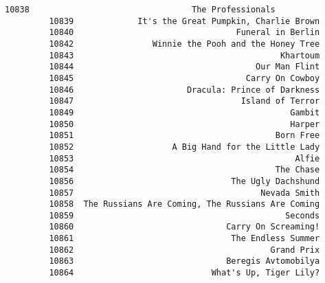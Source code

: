\documentclass[11pt]{article}
\begin{document}
\begin{Verbatim}[commandchars=\\\{\}]
         10838                                 The Professionals   
         10839             It's the Great Pumpkin, Charlie Brown   
         10840                                 Funeral in Berlin   
         10842                Winnie the Pooh and the Honey Tree   
         10843                                          Khartoum   
         10844                                     Our Man Flint   
         10845                                   Carry On Cowboy   
         10846                       Dracula: Prince of Darkness   
         10847                                  Island of Terror   
         10849                                            Gambit   
         10850                                            Harper   
         10851                                         Born Free   
         10852                    A Big Hand for the Little Lady   
         10853                                             Alfie   
         10854                                         The Chase   
         10856                                The Ugly Dachshund   
         10857                                      Nevada Smith   
         10858  The Russians Are Coming, The Russians Are Coming   
         10859                                           Seconds   
         10860                               Carry On Screaming!   
         10861                                The Endless Summer   
         10862                                        Grand Prix   
         10863                               Beregis Avtomobilya   
         10864                            What's Up, Tiger Lily?   
         

\end{Verbatim}
\end{document}
